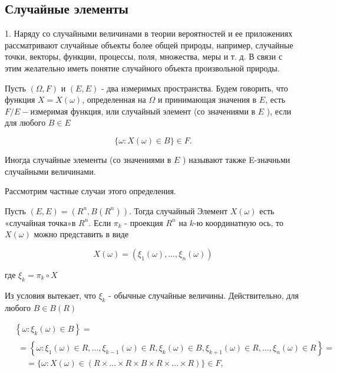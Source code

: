 \subsection{Случайные элементы}
\label{par_5}

1. Наряду со случайными величинами в теории вероятностей и ее приложениях рассматривают случайные объекты более общей природы, например, случайные точки, векторы, функции, процессы, поля, множества, меры и т. д. В связи с этим желательно иметь понятие случайного объекта произвольной природы.


\begin{definition}
Пусть $(\Omega, {F})$ и $(E, {E})$ - два измеримых пространства. Будем говорить, что функция $X=X(\omega)$, определенная на $\Omega$ и принимающая значения в $E$, есть ${F} / {E}-$измеримая функция, или случайный элемент (со значениями в $E$ ), если для любого $B \in {E}$

$$
\{\omega: X(\omega) \in B\} \in {F} .
$$
\end{definition}

Иногда случайные элементы (со значениями в $E$ ) называют также E-значньми случайными величинами.

Рассмотрим частные случаи этого определения.


Пусть $(E, {E})=\left(R^{n}, {B}\left(R^{n}\right)\right)$. Тогда случайный Элемент $X(\omega)$ есть «случайная точка»в $R^{n}$. Если $\pi_{k}$ - проекция $R^{n}$ на $k$-ю координатную ось, то $X(\omega)$ можно представить в виде

$$
X(\omega)=\left(\xi_{1}(\omega), \ldots, \xi_{n}(\omega)\right)
$$

где $\xi_{k}=\pi_{k} \circ X$

Из условия вытекает, что $\xi_{k}$ - обычные случайные величины. Действительно, для любого $B \in {B}(R)$

$$
\begin{aligned}
& \left\{\omega: \xi_{k}(\omega) \in B\right\}= \\
& \begin{array}{l}
=\left\{\omega: \xi_{1}(\omega) \in R, \ldots, \xi_{k-1}(\omega) \in R, \xi_{k}(\omega) \in B, \xi_{k+1}(\omega) \in R, \ldots, \xi_{n}(\omega) \in R\right\}= \\
\quad=\{\omega: X(\omega) \in(R \times \ldots \times R \times B \times R \times \ldots \times R)\} \in {F},
\end{array}
\end{aligned}
$$

